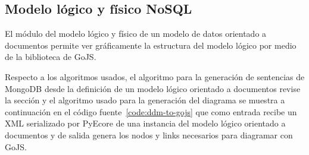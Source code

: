 \subsection{Modelo lógico y físico NoSQL}

El módulo del modelo lógico y físico de un modelo de datos orientado a documentos permite ver gráficamente la estructura del modelo lógico por medio de la biblioteca de GoJS.

Respecto a los algoritmos usados, el algoritmo para la generación de sentencias de MongoDB desde la definición de un modelo lógico orientado a documentos revise la sección y el algoritmo usado para la generación del diagrama se muestra a continuación en el código fuente~\ref{code:ddm-to-gojs} que como entrada recibe un XML serializado por PyEcore de una instancia del modelo lógico orientado a documentos y de salida genera los nodos y links necesarios para diagramar con GoJS.

